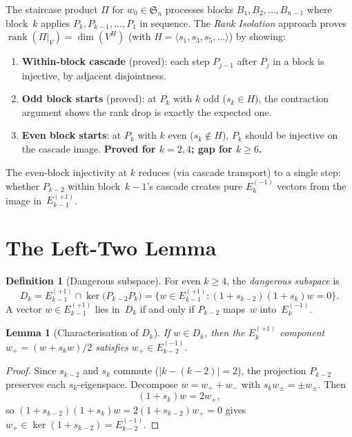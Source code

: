 \documentclass[11pt]{article}
\newtheorem{lemma}[theorem]{Lemma}
\theoremstyle{definition}
\newtheorem{definition}[theorem]{Definition}
\theoremstyle{remark}
\newcommand{\Sym}{\mathfrak{S}}
\newcommand{\rk}{\operatorname{rank}}
\newcommand{\Eplus}[1]{E_{#1}^{(+1)}}
\newcommand{\Eminus}[1]{E_{#1}^{(-1)}}
\newcommand{\kernel}{\operatorname{ker}}
\begin{document}
The staircase product $\Pi$ for $w_0 \in \Sym_n$ processes blocks
$B_1, B_2, \ldots, B_{n-1}$ where block~$k$ applies
$P_k, P_{k-1}, \ldots, P_1$ in sequence. The \emph{Rank Isolation}
approach proves $\rk(\Pi|_V) = \dim(V^H)$ (with $H = \langle s_1,
s_3, s_5, \ldots \rangle$) by showing:
\begin{enumerate}
  \item[(a)] \textbf{Within-block cascade} (proved): each step
    $P_{j-1}$ after $P_j$ in a block is injective, by adjacent
    disjointness.
  \item[(b)] \textbf{Odd block starts} (proved): at $P_k$ with $k$
    odd ($s_k \in H$), the contraction argument shows the rank drop
    is exactly the expected one.
  \item[(c)] \textbf{Even block starts}: at $P_k$ with $k$ even
    ($s_k \notin H$), $P_k$ should be injective on the cascade image.
    \textbf{Proved for $k = 2, 4$; gap for $k \ge 6$.}
\end{enumerate}

The even-block injectivity at $k$ reduces (via cascade transport) to
a single step: whether $P_{k-2}$ within block~$k{-}1$'s cascade creates
pure $\Eminus{k}$ vectors from the image in~$\Eplus{k-1}$.

\section{The Left-Two Lemma}\label{sec:left-two}

\begin{definition}[Dangerous subspace]
For even $k \ge 4$, the \emph{dangerous subspace} is
\[
  D_k = \Eplus{k-1} \cap \kernel\!\bigl(P_{k-2} P_k\bigr)
  = \bigl\{w \in \Eplus{k-1} : (1+s_{k-2})(1+s_k)w = 0\bigr\}.
\]
A vector $w \in \Eplus{k-1}$ lies in~$D_k$ if and only if $P_{k-2}$
maps~$w$ into~$\Eminus{k}$.
\end{definition}

\begin{lemma}[Characterisation of $D_k$]
\label{lem:dk-char}
If $w \in D_k$, then the $\Eplus{k}$ component
$w_+ = (w + s_k w)/2$ satisfies $w_+ \in \Eminus{k-2}$.
\end{lemma}
\begin{proof}
Since $s_{k-2}$ and $s_k$ commute ($|k - (k{-}2)| = 2$),
the projection $P_{k-2}$ preserves each $s_k$-eigenspace.
Decompose $w = w_+ + w_-$ with $s_k w_\pm = \pm w_\pm$. Then
\[
  (1 + s_k) w = 2 w_+,
\]
so $(1 + s_{k-2})(1 + s_k) w = 2(1 + s_{k-2}) w_+ = 0$ gives
$w_+ \in \kernel(1 + s_{k-2}) = \Eminus{k-2}$.
\end{proof}
\end{document}
